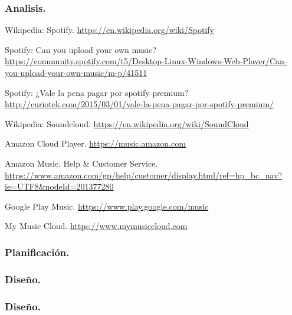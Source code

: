 \subsubsection*{Analisis.}

 Wikipedia: Spotify. \url{https://en.wikipedia.org/wiki/Spotify}

 Spotify: Can you upload your own music? \url{https://community.spotify.com/t5/Desktop-Linux-Windows-Web-Player/Can-you-upload-your-own-music/m-p/41511}

 Spotify: ¿Vale la pena pagar por spotify premium? \url{http://curiotek.com/2015/03/01/vale-la-pena-pagar-por-spotify-premium/}

 Wikipedia: Soundcloud. \url{https://en.wikipedia.org/wiki/SoundCloud}

 Amazon Cloud Player. \url{https://music.amazon.com}

 Amazon Music. Help & Customer Service. \url{https://www.amazon.com/gp/help/customer/display.html/ref=hp_bc_nav?ie=UTF8&nodeId=201377280}

 Google Play Music. \url{https://www.play.google.com/music}

 My Music Cloud. \url{https://www.mymusiccloud.com}


\subsubsection*{Planificación.}

\subsubsection*{Diseño.}

\subsubsection*{Diseño.}

